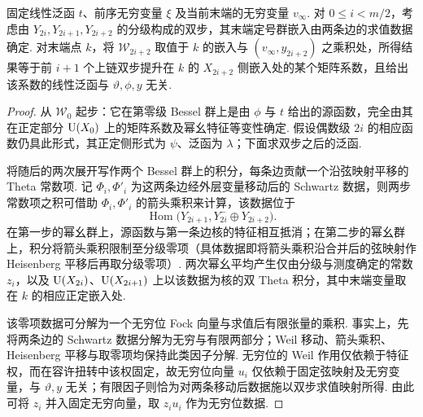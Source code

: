 \begin{lemma}[双步展开的矩阵系数]
\label{lem:a-seesaw-double-coefficient}
\emitthmsource
固定线性泛函 $t$、前序无穷变量 $\xi$ 及当前末端的无穷变量 $v_\infty$. 对 $0\le i<m/2$，考虑由 $Y_{2i},Y_{2i+1},Y_{2i+2}$ 的分级构成的双步，其末端定号群嵌入由两条边的求值数据确定. 对末端点 $k$，将 $\mathcal W_{2i+2}$ 取值于 $k$ 的嵌入与 $(v_\infty,y_{2i+2})$ 之乘积处，所得结果等于前 $i+1$ 个上链双步提升在 $k$ 的 $X_{2i+2}$ 侧嵌入处的某个矩阵系数，且给出该系数的线性泛函与 $\vartheta,\phi,y$ 无关.
\end{lemma}
\begin{proof}
从 $\mathcal W_0$ 起步：它在第零级 Bessel 群上是由 $\phi$ 与 $t$ 给出的源函数，完全由其在正定部分 $\operatorname{U}(X_0)$ 上的矩阵系数及幂幺特征等变性确定. 假设偶数级 $2i$ 的相应函数仍具此形式，其正定侧形式为 $\psi$、泛函为 $\lambda$；下面求双步之后的泛函.

将随后的两次展开写作两个 Bessel 群上的积分，每条边贡献一个沿弦映射平移的 Theta 常数项. 记 $\Phi_i,\Phi'_i$ 为这两条边经外层变量移动后的 Schwartz 数据，则两步常数项之积可借助 $\Phi_i,\Phi'_i$ 的箭头乘积来计算，该数据位于
\[
 \operatorname{Hom}\bigl(Y_{2i+1},Y_{2i}^{-}\oplus Y_{2i+2}\bigr).
\]
在第一步的幂幺群上，源函数与第一条边核的特征相互抵消；在第二步的幂幺群上，积分将箭头乘积限制至分级零项（具体数据即将箭头乘积沿合并后的弦映射作 Heisenberg 平移后再取分级零项）. 两次幂幺平均产生仅由分级与测度确定的常数 $z_i$，以及 $\operatorname{U}(X_{2i})$、$\operatorname{U}(X_{2i+1})$ 上以该数据为核的双 Theta 积分，其中末端变量取在 $k$ 的相应正定嵌入处.

该零项数据可分解为一个无穷位 Fock 向量与求值后有限张量的乘积. 事实上，先将两条边的 Schwartz 数据分解为无穷与有限两部分；Weil 移动、箭头乘积、Heisenberg 平移与取零项均保持此类因子分解. 无穷位的 Weil 作用仅依赖于特征权，而在容许扭转中该权固定，故无穷位向量 $u_i$ 仅依赖于固定弦映射及无穷变量，与 $\vartheta,y$ 无关；有限因子则恰为对两条移动后数据施以双步求值映射所得. 由此可将 $z_i$ 并入固定无穷向量，取 $z_i u_i$ 作为无穷位数据.


\end{proof}
